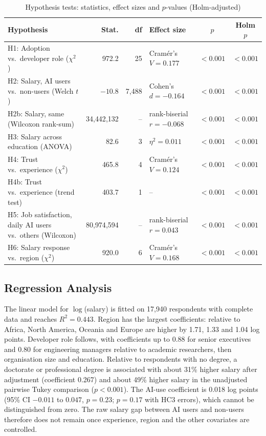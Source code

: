 \documentclass[conference]{IEEEtran}
\begin{document}
\begin{table}[t]
\caption{Hypothesis tests: statistics, effect sizes and $p$-values (Holm-adjusted)}
\label{tab:pval}
\centering
\small
\begin{tabular}{p{6.2cm}rrp{3.6cm}cc}
\toprule
\textbf{Hypothesis} & \textbf{Stat.} & \textbf{df} & \textbf{Effect size} & \textbf{$p$} & \textbf{Holm $p$} \\
\midrule
H1: Adoption vs.\ developer role ($\chi^2$) & 972.2 & 25 & Cram\'er's $V=0.177$ & $<0.001$ & $<0.001$ \\
H2: Salary, AI users vs.\ non-users (Welch $t$) & $-10.8$ & 7{,}488 & Cohen's $d=-0.164$ & $<0.001$ & $<0.001$ \\
H2b: Salary, same (Wilcoxon rank-sum) & 34{,}442{,}132 & -- & rank-biserial $r=-0.068$ & $<0.001$ & $<0.001$ \\
H3: Salary across education (ANOVA) & 82.6 & 3 & $\eta^2=0.011$ & $<0.001$ & $<0.001$ \\
H4: Trust vs.\ experience ($\chi^2$) & 465.8 & 4 & Cram\'er's $V=0.124$ & $<0.001$ & $<0.001$ \\
H4b: Trust vs.\ experience (trend test) & 403.7 & 1 & -- & $<0.001$ & $<0.001$ \\
H5: Job satisfaction, daily AI users vs.\ others (Wilcoxon) & 80{,}974{,}594 & -- & rank-biserial $r=0.043$ & $<0.001$ & $<0.001$ \\
H6: Salary response vs.\ region ($\chi^2$) & 920.0 & 6 & Cram\'er's $V=0.168$ & $<0.001$ & $<0.001$ \\
\bottomrule
\end{tabular}
\end{table}

\subsection{Regression Analysis}
The linear model for $\log$(salary) is fitted on 17{,}940 respondents with complete data and reaches $R^2=0.443$. Region has the largest coefficients: relative to Africa, North America, Oceania and Europe are higher by 1.71, 1.33 and 1.04 log points. Developer role follows, with coefficients up to 0.88 for senior executives and 0.80 for engineering managers relative to academic researchers, then organisation size and education. Relative to respondents with no degree, a doctorate or professional degree is associated with about 31\% higher salary after adjustment (coefficient 0.267) and about 49\% higher salary in the unadjusted pairwise Tukey comparison ($p<0.001$). The AI-use coefficient is 0.018 log points (95\% CI $-0.011$ to $0.047$, $p=0.23$; $p=0.17$ with HC3 errors), which cannot be distinguished from zero. The raw salary gap between AI users and non-users therefore does not remain once experience, region and the other covariates are controlled.
\end{document}
